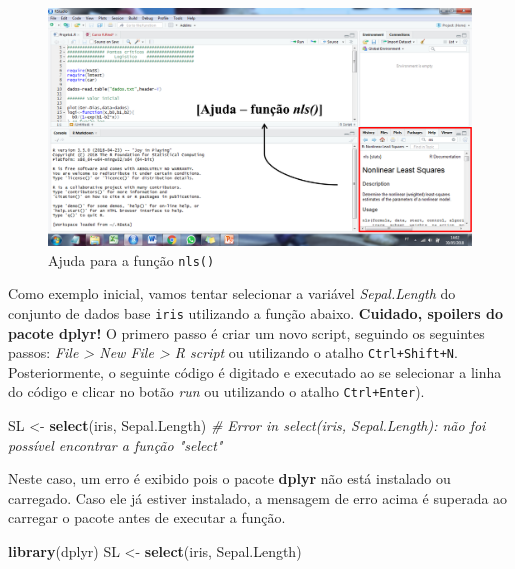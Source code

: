 \documentclass[
]{book}
\newenvironment{Shaded}{\begin{snugshade}}{\end{snugshade}}
\newcommand{\CommentTok}[1]{\textcolor[rgb]{0.56,0.35,0.01}{\textit{#1}}}
\newcommand{\KeywordTok}[1]{\textcolor[rgb]{0.13,0.29,0.53}{\textbf{#1}}}
\newcommand{\NormalTok}[1]{#1}
\newcommand{\StringTok}[1]{\textcolor[rgb]{0.31,0.60,0.02}{#1}}
\numberwithin{equation}{section}
\begin{document}
\begin{figure}
\centering
\includegraphics{figures/Help.png}
\caption{Ajuda para a função \texttt{nls()}}
\end{figure}

Como exemplo inicial, vamos tentar selecionar a variável \emph{Sepal.Length} do conjunto de dados base \texttt{iris} utilizando a função abaixo. \textbf{Cuidado, spoilers do pacote dplyr!} O primero passo é criar um novo script, seguindo os seguintes passos: \emph{File \textgreater{} New File \textgreater{} R script} ou utilizando o atalho \texttt{Ctrl+Shift+N}. Posteriormente, o seguinte código é digitado e executado ao se selecionar a linha do código e clicar no botão \emph{run} ou utilizando o atalho \texttt{Ctrl+Enter}).

\begin{Shaded}
\begin{Highlighting}[]
\NormalTok{SL \textless{}{-}}\StringTok{ }\KeywordTok{select}\NormalTok{(iris, Sepal.Length)}
\CommentTok{\# Error in select(iris, Sepal.Length): não foi possível encontrar a função "select"}
\end{Highlighting}
\end{Shaded}

Neste caso, um erro é exibido pois o pacote \textbf{dplyr} não está instalado ou carregado. Caso ele já estiver instalado, a mensagem de erro acima é superada ao carregar o pacote antes de executar a função.

\begin{Shaded}
\begin{Highlighting}[]
\KeywordTok{library}\NormalTok{(dplyr)}
\NormalTok{SL \textless{}{-}}\StringTok{ }\KeywordTok{select}\NormalTok{(iris, Sepal.Length)}
\end{Highlighting}
\end{Shaded}
\end{document}
